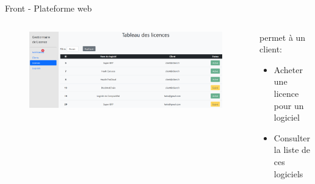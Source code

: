 \documentclass{cubeamer}
\begin{document}
\begin{frame}{Front - Plateforme web}
    \begin{columns}
        \begin{column}{.70\textwidth}
            \begin{figure}
                \includegraphics[scale=0.27]{img/web3.png}
            \end{figure}  
        \end{column}
 
        \begin{column}{.3\textwidth}
            permet à un client:            
            \begin{itemize}
                \item Acheter une licence pour un logiciel  
                \item Consulter la liste de ces logiciels 
            \end{itemize}
        \end{column}

    \end{columns}
\end{frame}
\end{document}
